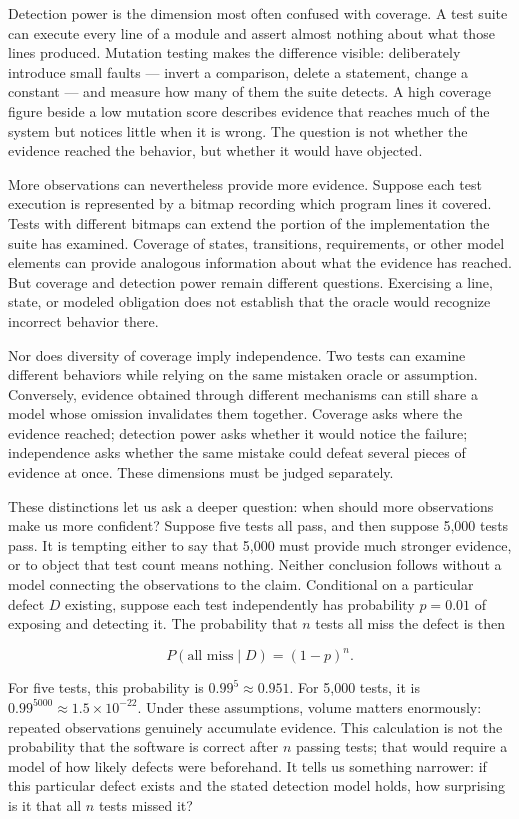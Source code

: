 Detection power is the dimension most often confused with coverage. A test suite can execute every
line of a module and assert almost nothing about what those lines produced. Mutation testing makes
the difference visible: deliberately introduce small faults --- invert a comparison, delete a
statement, change a constant --- and measure how many of them the suite detects. A high coverage
figure beside a low mutation score describes evidence that reaches much of the system but notices
little when it is wrong. The question is not whether the evidence reached the behavior, but whether
it would have objected.

More observations can nevertheless provide more evidence. Suppose each test execution is
represented by a bitmap recording which program lines it covered. Tests with different bitmaps can
extend the portion of the implementation the suite has examined. Coverage of states, transitions,
requirements, or other model elements can provide analogous information about what the evidence
has reached. But coverage and detection power remain different questions. Exercising a line,
state, or modeled obligation does not establish that the oracle would recognize incorrect behavior
there.

Nor does diversity of coverage imply independence. Two tests can examine different behaviors while
relying on the same mistaken oracle or assumption. Conversely, evidence obtained through different
mechanisms can still share a model whose omission invalidates them together. Coverage asks where
the evidence reached; detection power asks whether it would notice the failure; independence asks
whether the same mistake could defeat several pieces of evidence at once. These dimensions must be
judged separately.

These distinctions let us ask a deeper question: when should more observations make us more
confident? Suppose five tests all pass, and then suppose 5,000 tests pass. It is tempting either
to say that 5,000 must provide much stronger evidence, or to object that test count means nothing.
Neither conclusion follows without a model connecting the observations to the claim. Conditional
on a particular defect \(D\) existing, suppose each test independently has probability \(p = 0.01\) of
exposing and detecting it. The probability that \(n\) tests all miss the defect is then

\[P(\text{all miss} \mid D) = (1-p)^n.\]

For five tests, this probability is \(0.99^5 \approx 0.951\). For 5,000 tests, it is
\(0.99^{5000} \approx 1.5 \times 10^{-22}\). Under these assumptions, volume matters enormously:
repeated observations genuinely accumulate evidence. This calculation is not the probability that
the software is correct after \(n\) passing tests; that would require a model of how likely defects
were beforehand. It tells us something narrower: if this particular defect exists and the stated
detection model holds, how surprising is it that all \(n\) tests missed it?

